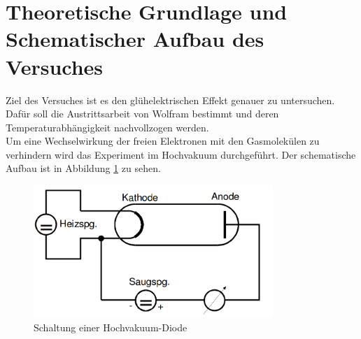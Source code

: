 \section{Theoretische Grundlage und Schematischer Aufbau des Versuches}
\label{sec:Theorie}
Ziel des Versuches ist es den glühelektrischen Effekt genauer zu untersuchen. Dafür soll die Austrittsarbeit von Wolfram bestimmt und deren Temperaturabhängigkeit nachvollzogen werden. \\
Um eine Wechselwirkung der freien Elektronen mit den Gasmolekülen zu verhindern wird das Experiment im Hochvakuum durchgeführt. Der schematische Aufbau ist in Abbildung \ref{fig:SHD} zu sehen.

\begin{figure}
  \centering
  \includegraphics[height=5cm]{picture/Diode.png}
  \caption{Schaltung einer Hochvakuum-Diode \cite{pra}}
  \label{fig:SHD}
\end{figure}

